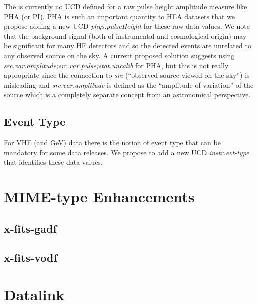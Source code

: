 \documentclass[11pt,a4paper]{ivoa}
\begin{document}
The is currently no UCD defined for a raw pulse height amplitude measure like PHA (or PI)\null.  PHA is such an important quantity to HEA datasets that we propose adding a new UCD {\em phys.pulseHeight\/} for these raw data values.  We note that the background signal (both of instrumental and cosmological origin) may be significant for many HE detectors and so the detected events are unrelated to any observed source on the sky.  A current proposed solution suggests using {\em src.var.amplitude;src.var.pulse;stat.uncalib\/} for PHA, but this is not really appropriate since the connection to {\em src\/} (``observed source viewed on the sky'') is misleading and {\em src.var.amplitude\/} is defined as the ``amplitude of variation'' of the source which is a completely separate concept from an astronomical perspective.

\subsection{Event Type}

For VHE (and GeV) data there is the notion of event type that can be mandatory for some data releases.  We propose to add a new UCD {\em instr.evt-type\/} that identifies these data values.


\section{MIME-type Enhancements}\label{sec:mimetypes}

\subsection{x-fits-gadf}

\subsection{x-fits-vodf}

\section{Datalink}\label{sec:datalink}



\pagebreak
\printglossaries



\appendix
\end{document}
